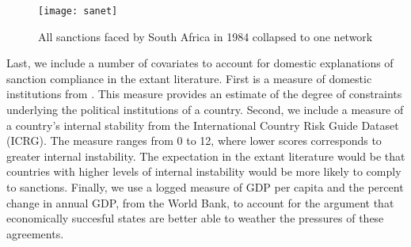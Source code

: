 \begin{figure}[ht]
	\centering
	\texttt{[image: sanet]}
	\caption{All sanctions faced by South Africa in 1984 collapsed to one network}
	\label{fig:sanet}
\end{figure}
\FloatBarrier

Last, we include a number of covariates to account for domestic explanations of sanction compliance in the extant literature. First is a measure of domestic institutions from \citet{henisz2000a}. This measure provides an estimate of the degree of constraints underlying the political institutions of a country. Second, we include a measure of a country's internal stability from the International Country Risk Guide Dataset (ICRG). The measure ranges from 0 to 12, where lower scores corresponds to greater internal instability. The expectation in the extant literature would be that countries with higher levels of internal instability would be more likely to comply to sanctions. Finally, we use a logged measure of GDP per capita and the percent change in annual GDP, from the World Bank, to account for the argument that economically succesful states are better able to weather the pressures of these agreements.